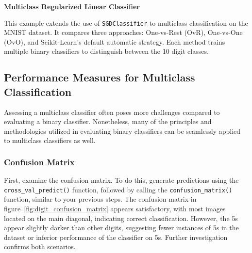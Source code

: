 \documentclass[12pt,letter]{article}
\begin{document}
\begin{example}
\textbf{Multiclass Regularized Linear Classifier}

\noindent This example extends the use of \texttt{SGDClassifier} to multiclass classification on the MNIST dataset. It compares three approaches: One-vs-Rest (OvR), One-vs-One (OvO), and Scikit-Learn's default automatic strategy. Each method trains multiple binary classifiers to distinguish between the 10 digit classes.
\end{example}



\subsection{Performance Measures for Multiclass Classification}


Assessing a multiclass classifier often poses more challenges compared to evaluating a binary classifier. Nonetheless, many of the principles and methodologies utilized in evaluating binary classifiers can be seamlessly applied to multiclass classifiers as well.


\subsubsection{Confusion Matrix}




First, examine the confusion matrix. To do this, generate predictions using the \texttt{cross\_val\_\allowbreak predict()} function, followed by calling the \texttt{confusion\_matrix()} function, similar to your previous steps. The confusion matrix in figure~\ref{fig:digit_confusion_matrix} appears satisfactory, with most images located on the main diagonal, indicating correct classification. However, the 5s appear slightly darker than other digits, suggesting fewer instances of 5s in the dataset or inferior performance of the classifier on 5s. Further investigation confirms both scenarios.
\end{document}
